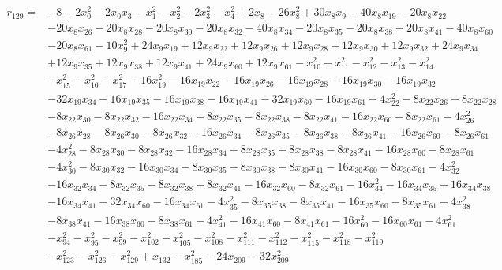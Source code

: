 \documentclass[10pt,letterpaper]{article}
\theoremstyle{remark}\newtheorem{remark}[theorem]{Remark}
\begin{document}
\begin{align*}
r_{129}={}&-8-2x_{0}^{2}-2x_{0}x_{3}-x_{1}^{2}-x_{2}^{2}-2x_{3}^{2}-x_{4}^{2}+2x_{8}-26x_{8}^{2}+30x_{8}x_{9}-40x_{8}x_{19}-20x_{8}x_{22}\\
&-20x_{8}x_{26}-20x_{8}x_{28}-20x_{8}x_{30}-20x_{8}x_{32}-40x_{8}x_{34}-20x_{8}x_{35}-20x_{8}x_{38}-20x_{8}x_{41}-40x_{8}x_{60}\\
&-20x_{8}x_{61}-10x_{9}^{2}+24x_{9}x_{19}+12x_{9}x_{22}+12x_{9}x_{26}+12x_{9}x_{28}+12x_{9}x_{30}+12x_{9}x_{32}+24x_{9}x_{34}\\
&+12x_{9}x_{35}+12x_{9}x_{38}+12x_{9}x_{41}+24x_{9}x_{60}+12x_{9}x_{61}-x_{10}^{2}-x_{11}^{2}-x_{12}^{2}-x_{13}^{2}-x_{14}^{2}\\
&-x_{15}^{2}-x_{16}^{2}-x_{17}^{2}-16x_{19}^{2}-16x_{19}x_{22}-16x_{19}x_{26}-16x_{19}x_{28}-16x_{19}x_{30}-16x_{19}x_{32}\\
&-32x_{19}x_{34}-16x_{19}x_{35}-16x_{19}x_{38}-16x_{19}x_{41}-32x_{19}x_{60}-16x_{19}x_{61}-4x_{22}^{2}-8x_{22}x_{26}-8x_{22}x_{28}\\
&-8x_{22}x_{30}-8x_{22}x_{32}-16x_{22}x_{34}-8x_{22}x_{35}-8x_{22}x_{38}-8x_{22}x_{41}-16x_{22}x_{60}-8x_{22}x_{61}-4x_{26}^{2}\\
&-8x_{26}x_{28}-8x_{26}x_{30}-8x_{26}x_{32}-16x_{26}x_{34}-8x_{26}x_{35}-8x_{26}x_{38}-8x_{26}x_{41}-16x_{26}x_{60}-8x_{26}x_{61}\\
&-4x_{28}^{2}-8x_{28}x_{30}-8x_{28}x_{32}-16x_{28}x_{34}-8x_{28}x_{35}-8x_{28}x_{38}-8x_{28}x_{41}-16x_{28}x_{60}-8x_{28}x_{61}\\
&-4x_{30}^{2}-8x_{30}x_{32}-16x_{30}x_{34}-8x_{30}x_{35}-8x_{30}x_{38}-8x_{30}x_{41}-16x_{30}x_{60}-8x_{30}x_{61}-4x_{32}^{2}\\
&-16x_{32}x_{34}-8x_{32}x_{35}-8x_{32}x_{38}-8x_{32}x_{41}-16x_{32}x_{60}-8x_{32}x_{61}-16x_{34}^{2}-16x_{34}x_{35}-16x_{34}x_{38}\\
&-16x_{34}x_{41}-32x_{34}x_{60}-16x_{34}x_{61}-4x_{35}^{2}-8x_{35}x_{38}-8x_{35}x_{41}-16x_{35}x_{60}-8x_{35}x_{61}-4x_{38}^{2}\\
&-8x_{38}x_{41}-16x_{38}x_{60}-8x_{38}x_{61}-4x_{41}^{2}-16x_{41}x_{60}-8x_{41}x_{61}-16x_{60}^{2}-16x_{60}x_{61}-4x_{61}^{2}\\
&-x_{94}^{2}-x_{95}^{2}-x_{99}^{2}-x_{102}^{2}-x_{105}^{2}-x_{108}^{2}-x_{111}^{2}-x_{112}^{2}-x_{115}^{2}-x_{118}^{2}-x_{119}^{2}\\
&-x_{123}^{2}-x_{126}^{2}-x_{129}^{2}+x_{132}-x_{185}^{2}-24x_{209}-32x_{209}^{2}
\end{align*}
\end{document}
